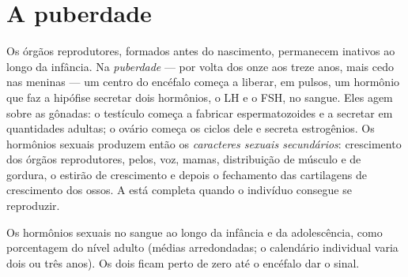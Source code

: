\section{A puberdade}

\begin{proposition}[A puberdade]\label{prop:g11:becoming-male-female:puberty}
Os órgãos reprodutores, formados antes do nascimento, permanecem
inativos ao longo da infância. Na \emph{puberdade} ---
por volta dos onze aos treze anos, mais cedo nas meninas --- um centro
do encéfalo começa a liberar, em pulsos, um hormônio que faz a hipófise
secretar dois hormônios, o LH e o FSH, no sangue. Eles agem sobre as
gônadas: o testículo começa a fabricar espermatozoides e a secretar
 em quantidades adultas; o ovário começa os ciclos dele e
secreta estrogênios. Os hormônios sexuais produzem então os
\emph{caracteres sexuais secundários}: crescimento dos órgãos
reprodutores, pelos, voz, mamas, distribuição de músculo e de gordura,
o estirão de crescimento e depois o fechamento das cartilagens de
crescimento dos ossos. A  está completa quando o indivíduo
consegue se reproduzir.
\end{proposition}
\admitted

\begin{omfigure}

{\small Os hormônios sexuais no sangue ao longo da infância e da
adolescência, como porcentagem do nível adulto (médias arredondadas; o
calendário individual varia dois ou três anos). Os dois ficam perto de
zero até o encéfalo dar o sinal.}
\end{omfigure}

